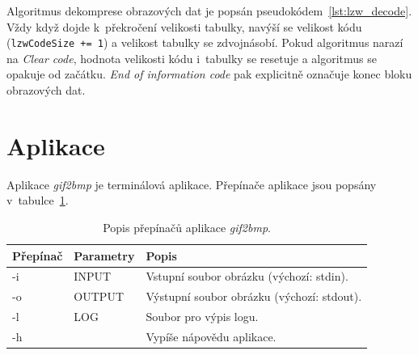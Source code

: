 \documentclass[12pt,a4paper,notitlepage,final]{article}
\begin{document}
Algoritmus dekomprese obrazových dat je popsán pseudokódem~\ref{lst:lzw_decode}.
Vždy když dojde k~překročení velikosti tabulky, navýší se velikost kódu
(\texttt{lzwCodeSize += 1}) a velikost tabulky se zdvojnásobí.
Pokud algoritmus narazí na \textit{Clear code}, hodnota velikosti kódu
i~tabulky se resetuje a algoritmus se opakuje od začátku.
\textit{End of information code} pak explicitně označuje konec bloku obrazových
dat.

\section{Aplikace}

Aplikace \textit{gif2bmp} je terminálová aplikace.
Přepínače aplikace jsou popsány v~tabulce~\ref{tbl:app}.

\begin{table}
  \centering
  \begin{tabular}{| l | l | l |}
    \hline
    \rowcolor[gray]{0.9}
    \textbf{Přepínač}	& \textbf{Parametry}	& \textbf{Popis} \\
    \hline
    -i & INPUT  & Vstupní soubor obrázku (výchozí: stdin). \\
    -o & OUTPUT & Výstupní soubor obrázku (výchozí: stdout). \\
    -l & LOG    & Soubor pro výpis logu. \\
    -h &        & Vypíše nápovědu aplikace.\\ \hline
  \end{tabular}
  \caption{Popis přepínačů aplikace \textit{gif2bmp}.}
  \label{tbl:app}
\end{table}


%
% 
\end{document}
